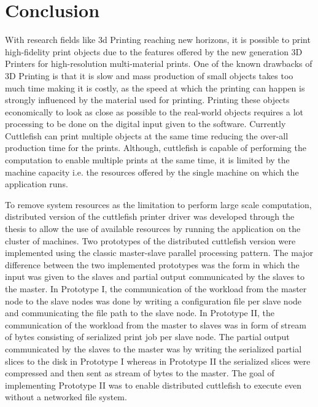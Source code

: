 \chapter{Conclusion}

With research fields like 3d Printing reaching new horizons, it is possible to print high-fidelity print objects due to the features offered by the new generation 3D Printers for high-resolution multi-material prints. One of the known drawbacks of 3D Printing is that it is slow and mass production of small objects takes too much time making it is costly, as the speed at which the printing can happen is strongly influenced by the material used for printing. Printing these objects economically to look as close as possible to the real-world objects requires a lot processing to be done on the digital input given to the software. Currently Cuttlefish can print multiple objects at the same time reducing the over-all production time for the prints. Although, cuttlefish is capable of performing the computation to enable multiple prints at the same time, it is limited by the machine capacity i.e. the resources offered by the single machine on which the application runs. \newline

To remove system resources as the limitation to perform large scale computation, distributed version of the cuttlefish printer driver was developed through the thesis to allow the use of available resources by running the application on the cluster of machines. Two prototypes of the distributed cuttlefish version were implemented using the classic master-slave parallel processing pattern. The major difference between the two implemented prototypes was the form in which the input was given to the slaves and partial output communicated by the slaves to the master. In Prototype I, the communication of the workload from the master node to the slave nodes was done by writing a configuration file per slave node and communicating the file path to the slave node. In Prototype II, the communication of the workload from the master to slaves was in form of stream of bytes consisting of serialized print job per slave node. The partial output communicated by the slaves to the master was by writing the serialized partial slices to the disk in Prototype I whereas in Prototype II the serialized slices were compressed and then sent as stream of bytes to the master. The goal of implementing Prototype II was to enable distributed cuttlefish to execute even without a networked file system.\newline 


